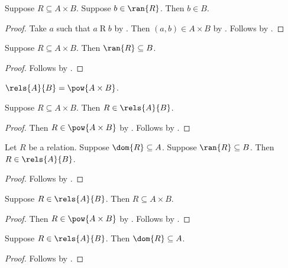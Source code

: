 \begin{proposition}\label{relation_subseteq_implies_ran_subseteq_elem}
    Suppose $R\subseteq A\times B$.
    Suppose $b\in\ran{R}$.
    Then $b\in B$.
\end{proposition}
\begin{proof}
    Take $a$ such that $a\mathrel{R}b$ by .
    Then $(a,b)\in A\times B$ by .
    Follows by .
\end{proof}

\begin{proposition}\label{relation_subseteq_implies_ran_subseteq}
    Suppose $R\subseteq A\times B$.
    Then $\ran{R}\subseteq B$.
\end{proposition}
\begin{proof}
    Follows by .
\end{proof}

\begin{definition}\label{rels}
    $\rels{A}{B} = \pow{A\times B}$.
\end{definition}

\begin{proposition}\label{rels_intro}
    Suppose $R\subseteq A\times B$.
    Then $R\in\rels{A}{B}$.
\end{proposition}
\begin{proof}
    Then $R\in\pow{A\times B}$ by .
    Follows by .
\end{proof}

\begin{proposition}\label{rels_intro_dom_and_ran}
    Let $R$ be a relation.
    Suppose $\dom{R}\subseteq A$.
    Suppose $\ran{R}\subseteq B$.
    Then $R\in\rels{A}{B}$.
\end{proposition}
\begin{proof}
    Follows by .
\end{proof}

\begin{proposition}\label{rels_elim}
    Suppose $R\in\rels{A}{B}$.
    Then $R\subseteq A\times B$.
\end{proposition}
\begin{proof}
    Then $R\in\pow{A\times B}$ by .
    Follows by .
\end{proof}

\begin{proposition}\label{rels_dom_subseteq}
    Suppose $R\in\rels{A}{B}$.
    Then $\dom{R}\subseteq A$.
\end{proposition}
\begin{proof}
    Follows by .
\end{proof}

